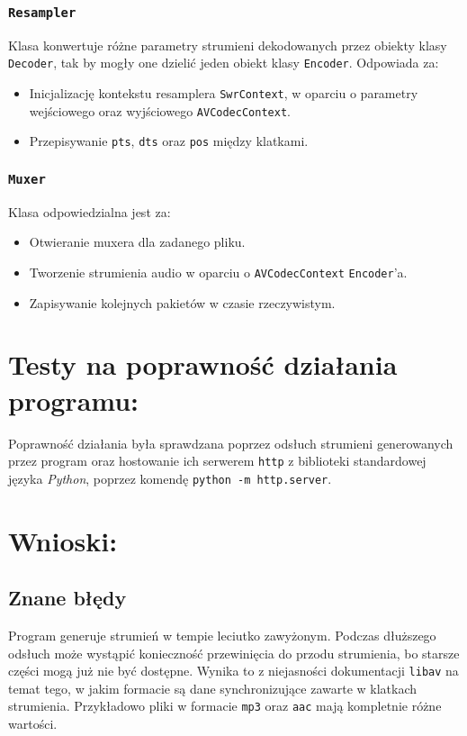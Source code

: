 \documentclass[a4paper,12pt]{article}
\begin{document}
\subsubsection{\texttt{Resampler}}

Klasa konwertuje różne parametry strumieni dekodowanych przez obiekty klasy
\texttt{Decoder}, tak by mogły one dzielić jeden obiekt klasy \texttt{Encoder}.
Odpowiada za: 
\begin{itemize}
    \item Inicjalizację kontekstu resamplera \texttt{SwrContext}, w oparciu o
        parametry wejściowego oraz wyjściowego \texttt{AVCodecContext}.
    \item Przepisywanie \texttt{pts}, \texttt{dts} oraz \texttt{pos} między klatkami.
\end{itemize}

\subsubsection{\texttt{Muxer}}

Klasa odpowiedzialna jest za: 
\begin{itemize}
    \item Otwieranie muxera dla zadanego pliku. 
    \item Tworzenie strumienia audio w oparciu o \texttt{AVCodecContext}
        \texttt{Encoder}'a.
    \item Zapisywanie kolejnych pakietów w czasie rzeczywistym.
\end{itemize}


\section{Testy na poprawność działania programu:}

Poprawność działania była sprawdzana poprzez odsłuch strumieni generowanych
przez program oraz hostowanie ich serwerem \texttt{http} z biblioteki
standardowej języka \emph{Python}, poprzez komendę \texttt{python -m
http.server}.

\section{Wnioski:}

\subsection*{Znane błędy}

Program generuje strumień w tempie leciutko zawyżonym. Podczas dłuższego odsłuch
może wystąpić konieczność przewinięcia do przodu strumienia, bo starsze części
mogą już nie być dostępne. Wynika to z niejasności dokumentacji \texttt{libav}
na temat tego, w jakim formacie są dane synchronizujące zawarte w klatkach
strumienia. Przykładowo pliki w formacie \texttt{mp3} oraz \texttt{aac}
mają kompletnie różne wartości. 
\end{document}

